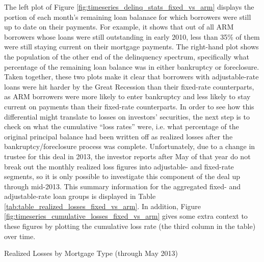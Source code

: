 \documentclass[12pt]{article}
\begin{document}
The left plot of Figure \ref{fig:timeseries_delinq_stats_fixed_vs_arm} displays the portion of each month's remaining loan balanace for which borrowers were still up to date on their payments. For example, it shows that out of all ARM borrowers whose loans were still outstanding in early 2010, less than 35\% of them were still staying current on their mortgage payments. The right-hand plot shows the population of the other end of the delinquency spectrum, specifically what percentage of the remaining loan balance was in either bankruptcy or foreclosure. Taken together, these two plots make it clear that borrowers with adjustable-rate loans were hit harder by the Great Recession than their fixed-rate counterparts, as ARM borrowers were more likely to enter bankruptcy and less likely to stay current on payments than their fixed-rate counterparts. In order to see how this differential might translate to losses on investors’ securities, the next step is to check on what the cumulative “loss rates” were, i.e. what percentage of the original principal balance had been written off as realized losses after the bankruptcy/foreclosure process was complete. Unfortunately, due to a change in trustee for this deal in 2013, the investor reports after May of that year do not break out the monthly realized loss figures into adjustable- and fixed-rate segments, so it is only possible to investigate this component of the deal up through mid-2013. This summary information for the aggregated fixed- and adjustable-rate loan groups is displayed in Table \ref{tab:table_realized_losses_fixed_vs_arm}. In addition, Figure \ref{fig:timeseries_cumulative_losses_fixed_vs_arm} gives some extra context to these figures by plotting the cumulative loss rate (the third column in the table) over time.

\begin{table}[h]
	\centering
	
	\caption{Realized Losses by Mortgage Type (through May 2013)}
	\label{tab:table_realized_losses_fixed_vs_arm}
\end{table}
\end{document}

